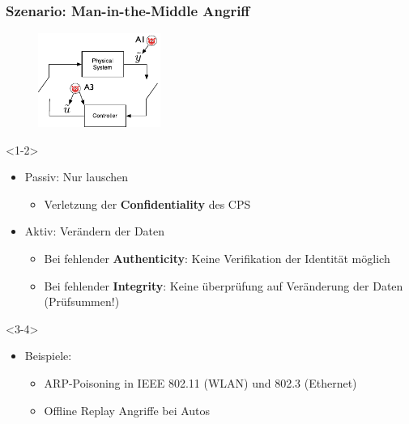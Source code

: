 \documentclass{sikslides}
\begin{document}
    \begin{frame}[t]
        \frametitle{Szenario: Man-in-the-Middle Angriff}
        \begin{overlayarea}{\linewidth}{4cm}
            \begin{figure}
                \centering
                \includegraphics[width=4cm]{figure/mitm}
            \end{figure}
        \end{overlayarea}
        \begin{onlyenv}<1-2>
        \begin{itemize}
            \item Passiv: Nur lauschen
            \begin{itemize}
                \item Verletzung der \textbf{Confidentiality} des CPS
                \pause
            \end{itemize}
            \item Aktiv: Verändern der Daten
            \begin{itemize}
                \item Bei fehlender \textbf{Authenticity}: Keine Verifikation der Identität möglich
                \item Bei fehlender \textbf{Integrity}: Keine überprüfung auf Veränderung der Daten (Prüfsummen!)
            \end{itemize}
            \pause
        \end{itemize}
        \end{onlyenv}

        \begin{onlyenv}<3-4>
        \begin{itemize}
            \item Beispiele:
            \begin{itemize}
                \item ARP-Poisoning in IEEE 802.11 (WLAN) und 802.3 (Ethernet)
                \pause
                \item Offline Replay Angriffe bei Autos
            \end{itemize}
        \end{itemize}
        \end{onlyenv}

    \end{frame}
\end{document}
